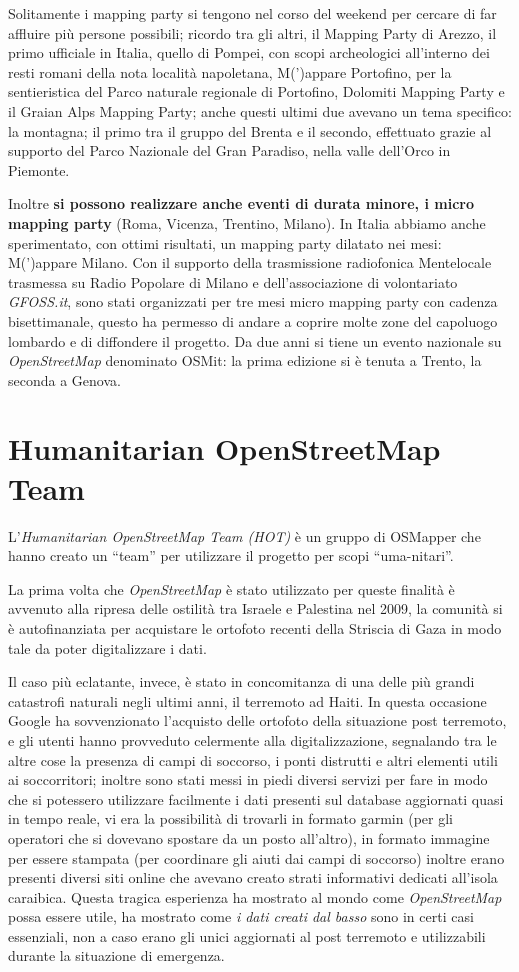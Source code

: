 \documentclass[a4paper,twoside,12pt,]{article}
\newcommand{\osm}{\emph{OpenStreetMap}\xspace}
\newcommand{\pro}[1]{\emph{#1}}
\begin{document}
Solitamente i mapping party si tengono nel corso del weekend per cercare di far affluire più persone possibili; ricordo tra gli altri, il Mapping Party di Arezzo, il primo ufficiale in Italia, quello di Pompei, con scopi archeologici all'interno dei resti romani della nota località napoletana, M(')appare Portofino, per la sentieristica del Parco naturale regionale di Portofino, Dolomiti Mapping Party e il Graian Alps Mapping Party; anche questi ultimi due avevano un tema specifico: la montagna; il primo tra il gruppo del Brenta e il secondo, effettuato grazie al supporto del Parco Nazionale del Gran Paradiso, nella valle dell'Orco in Piemonte.

Inoltre \textbf{si possono realizzare anche eventi di durata minore, i micro mapping party} (Roma, Vicenza, Trentino, Milano). In Italia abbiamo anche sperimentato, con ottimi risultati, un mapping party dilatato nei mesi: M(')appare Milano. Con il supporto della trasmissione radiofonica Mentelocale trasmessa su Radio Popolare di Milano e dell'associazione di volontariato \pro{GFOSS.it}, sono stati organizzati per tre mesi micro mapping party con cadenza bisettimanale, questo ha permesso di andare a coprire molte zone del capoluogo lombardo e di diffondere il progetto. Da due anni si tiene un evento nazionale su \osm denominato OSMit: la prima edizione si è tenuta a Trento, la seconda a Genova.
\section{Humanitarian OpenStreetMap Team}
L'\pro{Humanitarian OpenStreetMap Team (HOT)} è un gruppo di OSMapper che hanno creato un ``team'' per utilizzare il progetto per scopi ``uma-nitari''.

La prima volta che \osm è stato utilizzato per queste finalità è avvenuto alla ripresa delle ostilità tra Israele e Palestina nel 2009, la comunità si è autofinanziata per acquistare le ortofoto recenti della Striscia di Gaza in modo tale da poter digitalizzare i dati.

Il caso più eclatante, invece, è stato in concomitanza di una delle più grandi catastrofi naturali negli ultimi anni, il terremoto ad Haiti. In questa occasione Google ha sovvenzionato l'acquisto delle ortofoto della situazione post terremoto, e gli utenti hanno provveduto celermente alla digitalizzazione, segnalando tra le altre cose la presenza di campi di soccorso, i ponti distrutti e altri elementi utili ai soccorritori; inoltre sono stati messi in piedi diversi servizi per fare in modo che si potessero utilizzare facilmente i dati presenti sul database aggiornati quasi in tempo reale, vi era la possibilità di trovarli in formato garmin (per gli operatori che si dovevano spostare da un posto all'altro), in formato immagine per essere stampata (per coordinare gli aiuti dai campi di soccorso) inoltre erano presenti diversi siti online che avevano creato strati informativi dedicati all'isola caraibica. Questa tragica esperienza ha mostrato al mondo come \osm possa essere utile, ha mostrato come \textit{i dati creati dal basso} sono in certi casi essenziali, non a caso erano gli unici aggiornati al post terremoto e utilizzabili durante la situazione di emergenza.
\end{document}
